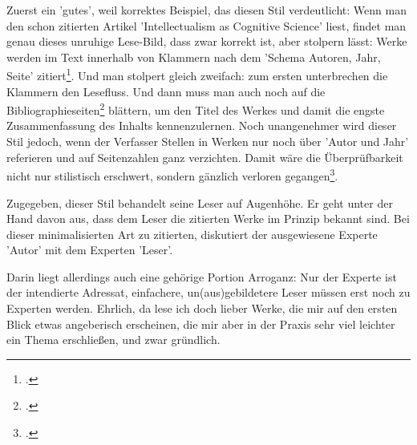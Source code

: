 Zuerst ein 'gutes', weil korrektes Beispiel, das diesen Stil verdeutlicht: Wenn
man den schon zitierten Artikel 'Intellectualism as Cognitive Science' liest,
findet man genau dieses unruhige Lese-Bild, dass zwar korrekt ist, aber stolpern
lässt: Werke werden im Text innerhalb von Klammern nach dem 'Schema Autoren,
Jahr, Seite' zitiert\footcite[vgl.][25]{RotCum2011a}. Und man stolpert gleich
zweifach: zum ersten unterbrechen die Klammern den Lesefluss. Und dann muss man
auch noch auf die Bibliographieseiten\footcite[vgl.][38f]{RotCum2011a} blättern,
um den Titel des Werkes und damit die engste Zusammenfassung des Inhalts
kennenzulernen. Noch unangenehmer wird dieser Stil jedoch, wenn der Verfasser
Stellen in Werken nur noch über 'Autor und Jahr' referieren und auf Seitenzahlen
ganz verzichten. Damit wäre die Überprüfbarkeit nicht nur stilistisch erschwert,
sondern gänzlich verloren gegangen\footcite[vgl. z.B.][151]{Bechtel2011a}.

Zugegeben, dieser Stil behandelt seine Leser auf Augenhöhe. Er geht unter der
Hand davon aus, dass dem Leser die zitierten Werke im Prinzip bekannt sind. Bei
dieser minimalisierten Art zu zitierten, diskutiert der ausgewiesene Experte
'Autor' mit dem Experten 'Leser'.

Darin liegt allerdings auch eine gehörige Portion Arroganz: Nur der Experte ist
der intendierte Adressat, einfachere, un\-(aus)\-ge\-bil\-de\-te\-re Leser
müssen erst noch zu Experten werden. Ehrlich, da lese ich doch lieber Werke, die
mir auf den ersten Blick etwas angeberisch erscheinen, die mir aber in der
Praxis sehr viel leichter ein Thema erschließen, und zwar gründlich.


%
